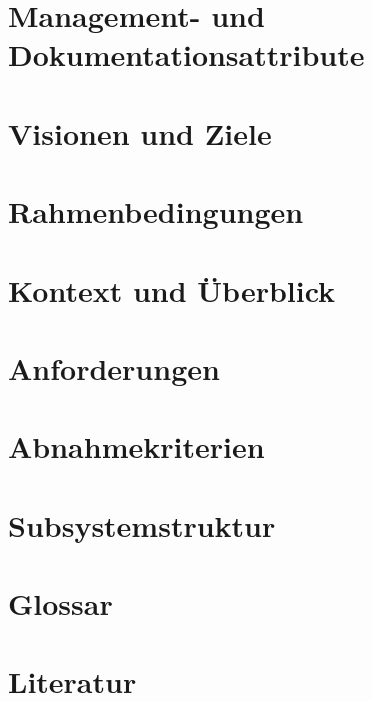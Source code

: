 \documentclass[12pt]{article}
\begin{document}
%
%


\tableofcontents{}
\newpage{}



\section{Management- und Dokumentationsattribute}

       
	\noindent 

\section{Visionen und Ziele}

	\noindent 
	
\section{Rahmenbedingungen}

	\noindent 
	
\section{Kontext und Überblick}

	\noindent 
	
\section{Anforderungen}

	\noindent 	
	
\section{Abnahmekriterien}

	\noindent 	
				
\section{Subsystemstruktur}

	\noindent 
				
\section{Glossar}

	\noindent 	
	
\section{Literatur}

	\noindent 
\end{document}
